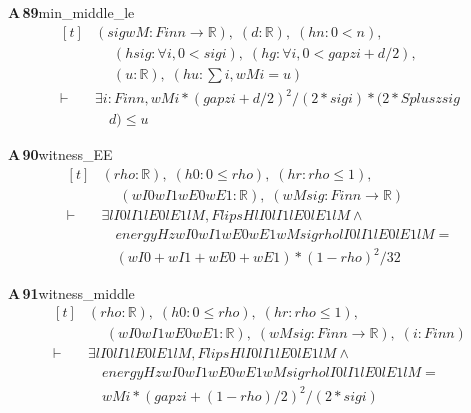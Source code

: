 \documentclass[conference]{IEEEtran}
\theoremstyle{definition}
\newcommand{\lean}[1]{\textsf{\footnotesize #1}}
\begin{document}
\noindent\textbf{A\,89}\quad\lean{min\_middle\_le}
{\footnotesize\[ \begin{aligned}[t]
&(\mathit{sig} \mathit{wM} : \mathit{Fin} \mathit{n} \to \mathbb{R} ),\; (\mathit{d} : \mathbb{R} ),\; (\mathit{hn} : 0 < \mathit{n}),\\
&\quad \; (\mathit{hsig} : \forall \mathit{i}, 0 < \mathit{sig} \mathit{i}),\; (\mathit{hg} : \forall \mathit{i}, 0 < \mathit{gap} \mathit{z} \mathit{i} + \mathit{d}/2),\\
&\quad \; (\mathit{u} : \mathbb{R} ),\; (\mathit{hu} : \textstyle\sum \mathit{i}, \mathit{wM} \mathit{i} = \mathit{u})\\
\vdash\;&\exists \mathit{i} : \mathit{Fin} \mathit{n}, \mathit{wM} \mathit{i}*(\mathit{gap} \mathit{z} \mathit{i} + \mathit{d}/2)^{2}/(2*\mathit{sig} \mathit{i})*(2*\mathit{Splus} \mathit{z} \mathit{sig}\\
&\quad \mathit{d}) \leq \mathit{u}
\end{aligned} \]}

\noindent\textbf{A\,90}\quad\lean{witness\_EE}
{\footnotesize\[ \begin{aligned}[t]
&(\mathit{rho} : \mathbb{R} ),\; (\mathit{h0} : 0 \leq \mathit{rho}),\; (\mathit{hr} : \mathit{rho} \leq 1),\\
&\quad \; (\mathit{wI0} \mathit{wI1} \mathit{wE0} \mathit{wE1} : \mathbb{R} ),\; (\mathit{wM} \mathit{sig} : \mathit{Fin} \mathit{n} \to \mathbb{R} )\\
\vdash\;&\exists \mathit{lI0} \mathit{lI1} \mathit{lE0} \mathit{lE1} \mathit{lM}, \mathit{FlipsH} \mathit{lI0} \mathit{lI1} \mathit{lE0} \mathit{lE1} \mathit{lM} \wedge\\
&\quad \mathit{energyH} \mathit{z} \mathit{wI0} \mathit{wI1} \mathit{wE0} \mathit{wE1} \mathit{wM} \mathit{sig} \mathit{rho} \mathit{lI0} \mathit{lI1} \mathit{lE0} \mathit{lE1} \mathit{lM} =\\
&\quad (\mathit{wI0} + \mathit{wI1} + \mathit{wE0} + \mathit{wE1})*(1-\mathit{rho})^{2}/32
\end{aligned} \]}

\noindent\textbf{A\,91}\quad\lean{witness\_middle}
{\footnotesize\[ \begin{aligned}[t]
&(\mathit{rho} : \mathbb{R} ),\; (\mathit{h0} : 0 \leq \mathit{rho}),\; (\mathit{hr} : \mathit{rho} \leq 1),\\
&\quad \; (\mathit{wI0} \mathit{wI1} \mathit{wE0} \mathit{wE1} : \mathbb{R} ),\; (\mathit{wM} \mathit{sig} : \mathit{Fin} \mathit{n} \to \mathbb{R} ),\; (\mathit{i} : \mathit{Fin} \mathit{n})\\
\vdash\;&\exists \mathit{lI0} \mathit{lI1} \mathit{lE0} \mathit{lE1} \mathit{lM}, \mathit{FlipsH} \mathit{lI0} \mathit{lI1} \mathit{lE0} \mathit{lE1} \mathit{lM} \wedge\\
&\quad \mathit{energyH} \mathit{z} \mathit{wI0} \mathit{wI1} \mathit{wE0} \mathit{wE1} \mathit{wM} \mathit{sig} \mathit{rho} \mathit{lI0} \mathit{lI1} \mathit{lE0} \mathit{lE1} \mathit{lM} =\\
&\quad \mathit{wM} \mathit{i}*(\mathit{gap} \mathit{z} \mathit{i} + (1-\mathit{rho})/2)^{2}/(2*\mathit{sig} \mathit{i})
\end{aligned} \]}
\end{document}
